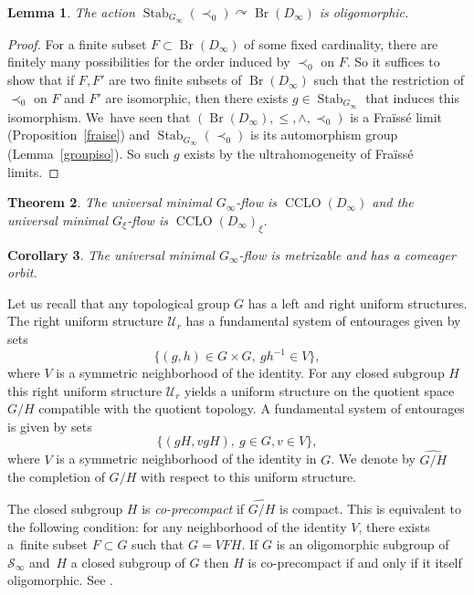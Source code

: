 \documentclass[JEP,XML,SOM,Unicode,NoFloatCountersInSection]{cedram}
\let\mathcal\mathscr
\theoremstyle{plain}
\newtheorem{thm}{Theorem}[section]
\newtheorem{lem}[thm]{Lemma}
\newtheorem{cor}[thm]{Corollary}
\theoremstyle{definition}
\newcommand{\cS}{\mathcal{S}}
\newcommand{\cU}{\mathcal{U}}
\newcommand{\sinf}{\cS_\infty}
\let\action\curvearrowright
\DeclareMathOperator{\Br}{Br}
\DeclareMathOperator{\Stab}{Stab}
\DeclareMathOperator{\CLO}{CCLO}
\begin{document}
\begin{lem}The action $\Stab_{G_\infty}(\prec_0)\action \Br(D_\infty)$ is oligomorphic.\end{lem}

\begin{proof} For a finite subset $F\subset \Br(D_\infty)$ of some fixed cardinality, there are finitely many possibilities for the order induced by $\prec_0$ on $F$. So it suffices to show that if $F, F'$ are two finite subsets of $\Br(D_\infty)$ such that the restriction of $\prec_0$ on $F$ and $F'$ are isomorphic, then there exists $g\in\Stab_{G_\infty}$ that induces this isomorphism. We~have seen that $(\Br(D_\infty),\leq,\wedge,\prec_0)$ is a Fraïssé limit (Proposition~\ref{fraise}) and $\Stab_{G_\infty}(\prec_0)$ is its automorphism group (Lemma~\ref{groupiso}). So such $g$ exists by the ultrahomogeneity of Fraïssé limits.
\end{proof}

\begin{thm}\label{univminflow} The universal minimal $G_\infty$-flow is $\CLO(D_\infty)$ and the universal minimal $G_{\xi}$-flow is $\CLO(D_\infty)_{\xi}$.
\end{thm}

\begin{cor}The universal minimal $G_\infty$-flow is metrizable and has a comeager orbit.
\end{cor}

Let us recall that any topological group $G$ has a left and right uniform structures. The right uniform structure $\cU_r$ has a fundamental system of entourages given by sets
\[
\{(g,h)\in G\times G,\ gh^{-1}\in V\},
\]
where $V$ is a symmetric neighborhood of the identity. For any closed subgroup $H$ this right uniform structure $\cU_r$ yields a uniform structure on the quotient space $G/H$ compatible with the quotient topology. A fundamental system of entourages is given by sets\vspace*{-3pt}
\[
\{(gH,vgH),\ g\in G, v\in V\},
\]
where $V$ is a symmetric neighborhood of the identity in $G$. We denote by $\widehat{G/H}$ the completion of $G/H$ with respect to this uniform structure.

The closed subgroup $H$ is \emph{co-precompact} if $\widehat{G/H}$ is compact. This is equivalent to the following condition: for any neighborhood of the identity $V$, there exists a~finite subset $F\subset G$ such that $G=VFH$. If $G$ is an oligomorphic subgroup of~$\sinf$ and~$H$ a closed subgroup of $G$ then $H$ is co-precompact if and only if it itself oligomorphic. See \cite[\S 2]{MR3080786}.
\end{document}
